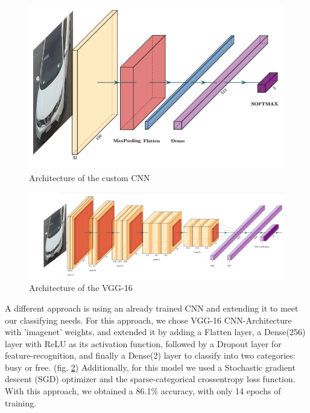 \documentclass[runningheads,a4paper,11pt]{report}
\begin{document}
\begin{figure}[htbp]
	\centerline{\includegraphics{images/Architecture}}  
	\caption{Architecture of the custom CNN}
	\label{fig:architectureimg}
\end{figure}

\begin{figure}[htbp]
	\centerline{\includegraphics[width=18cm]{images/vgg16}}  
	\caption{Architecture of the VGG-16}
	\label{fig:vggarchitecture}
\end{figure}
  
\par
A different approach is using an already trained CNN and extending it to meet our classifying needs.
For this approach, we chose VGG-16 CNN-Architecture with 'imagenet' weights, and extended it by adding a Flatten layer, a Dense(256) layer with ReLU as its activation
function, followed by a Dropout layer for feature-recognition, and finally a Dense(2) layer to classify into two categories: busy or free. (fig. \ref{fig:vggarchitecture})
Additionally, for this model we used a Stochastic gradient descent (SGD) optimizer and the sparse-categorical crossentropy loss function.
With this approach, we obtained a 86.1\% accuracy, with only 14 epochs of training.
  
\end{document}

